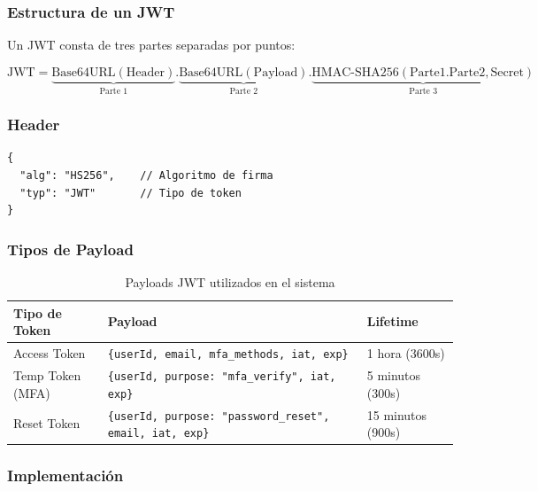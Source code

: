 \documentclass[12pt,a4paper,openany]{article}
\begin{document}
\subsubsection{Estructura de un JWT}

Un JWT consta de tres partes separadas por puntos:

\begin{equation}
\text{JWT} = \underbrace{\text{Base64URL}(\text{Header})}_{\text{Parte 1}} . \underbrace{\text{Base64URL}(\text{Payload})}_{\text{Parte 2}} . \underbrace{\text{HMAC-SHA256}(\text{Parte1}.\text{Parte2}, \text{Secret})}_{\text{Parte 3}}
\end{equation}

\subsubsection{Header}

\begin{lstlisting}[style=jsstyle, caption={Estructura del header JWT}]
{
  "alg": "HS256",    // Algoritmo de firma
  "typ": "JWT"       // Tipo de token
}
\end{lstlisting}

\subsubsection{Tipos de Payload}

\begin{table}[H]
\centering
\caption{Payloads JWT utilizados en el sistema}
\begin{tabular}{@{}p{3cm}p{4cm}p{4cm}@{}}
\toprule
\textbf{Tipo de Token} & \textbf{Payload} & \textbf{Lifetime} \\
\midrule
Access Token & \texttt{\{userId, email, mfa\_methods, iat, exp\}} & 1 hora (3600s) \\
Temp Token (MFA) & \texttt{\{userId, purpose: "mfa\_verify", iat, exp\}} & 5 minutos (300s) \\
Reset Token & \texttt{\{userId, purpose: "password\_reset", email, iat, exp\}} & 15 minutos (900s) \\
\bottomrule
\end{tabular}
\end{table}

\subsubsection{Implementación}
\end{document}
